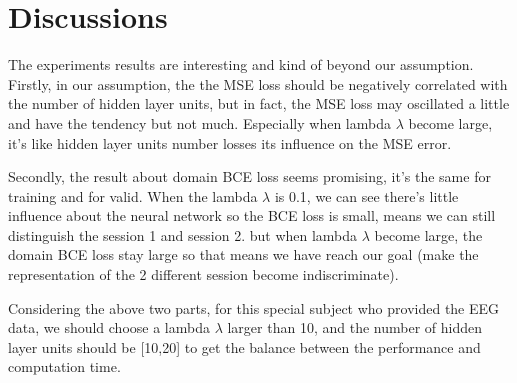 
\chapter{Discussions} %

\label{Chapter6} %

The experiments results are interesting and kind of beyond our assumption. 
Firstly, in our assumption, the the MSE loss should be negatively correlated with the number of hidden layer units, but in fact, the MSE loss may oscillated a little and have the tendency but not much. Especially when lambda $\lambda$ become large, it's like hidden layer units number losses its influence on the MSE error. 

Secondly, the result about domain BCE loss seems promising, it's the same for training and for valid. When the lambda $\lambda$ is 0.1, we can see there's little influence about the neural network so the BCE loss is small, means we can still distinguish the session 1 and session 2. but when lambda $\lambda$ become large, the domain BCE loss stay large so that means we have reach our goal (make the representation of the 2 different session become indiscriminate).

Considering the above two parts, for this special subject who provided the EEG data, we should choose a lambda $\lambda$ larger than 10, and the number of hidden layer units should be [10,20] to get the balance between the performance and computation time.